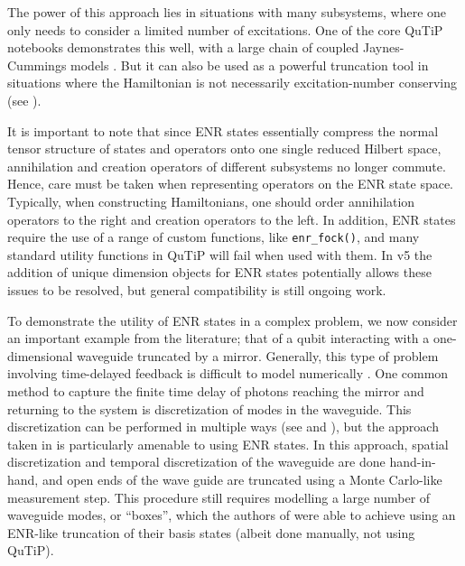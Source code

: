 \documentclass[preprint,3p,sort&compress]{elsarticle}
\def\code#1{\texttt{#1}}
\begin{document}
The power of this approach lies in situations with many subsystems, where one only needs to consider a limited number of excitations. One of the core QuTiP notebooks demonstrates this well, with a large chain of coupled Jaynes-Cummings models \cite{enr_chain}.  But it can also be used as a powerful truncation tool in situations where the Hamiltonian is not necessarily excitation-number conserving (see \cite{feist}).

It is important to note that since ENR states essentially compress the normal tensor structure of states and operators onto one single reduced Hilbert space, annihilation and creation operators of different subsystems no longer commute. Hence, care must be taken when representing operators on the ENR state space.  Typically, when constructing Hamiltonians, one should order annihilation operators to the right and creation operators to the left. In addition, ENR states require the use of a range of custom functions, like \code{enr\_fock()}, and many standard utility functions in QuTiP will fail when used with them.  In v5 the addition of unique dimension objects for ENR states potentially allows these issues to be resolved, but general compatibility is still ongoing work.

To demonstrate the utility of ENR states in a complex problem, we now consider an important example from the literature; that of a qubit interacting with a one-dimensional waveguide \cite{zueco} truncated by a mirror.  Generally, this type of problem involving time-delayed feedback is difficult to model numerically \cite{Zhang2017}.  One common method to capture the finite time delay of photons reaching the mirror and returning to the system is discretization of modes in the waveguide.  This discretization can be performed in multiple ways (see \cite{zueco} and \cite{arne}), but the approach taken in \cite{stephenhughes1,PhysRevA.106.013714} is  particularly amenable to using ENR states. In this approach, spatial discretization and temporal discretization of the waveguide are done hand-in-hand, and open ends of the wave guide are truncated using a Monte Carlo-like measurement step. This procedure still requires modelling a large number of waveguide modes, or ``boxes'', which the authors of \cite{stephenhughes1} were able to achieve using an ENR-like truncation of their basis states (albeit done manually, not using QuTiP).
\end{document}
